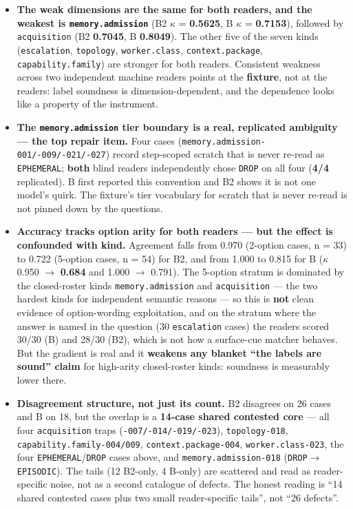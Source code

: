 \documentclass[11pt,a4paper]{article}
\begin{document}
\begin{itemize}
\item \textbf{The weak dimensions are the same for both readers, and the weakest is \texttt{memory.admission}} (B2 $\kappa$ = \textbf{0.5625}, B $\kappa$ = \textbf{0.7153}), followed by \texttt{acquisition} (B2 \textbf{0.7045}, B \textbf{0.8049}). The other five of the seven kinds (\texttt{escalation}, \texttt{topology}, \texttt{worker.class}, \texttt{context.package}, \texttt{capability.family}) are stronger for both readers. Consistent weakness across two independent machine readers points at the \textbf{fixture}, not at the readers: label soundness is dimension-dependent, and the dependence looks like a property of the instrument.
\item \textbf{The \texttt{memory.admission} tier boundary is a real, replicated ambiguity --- the top repair item.} Four cases (\texttt{memory.admission-001/-009/-021/-027}) record step-scoped scratch that is never re-read as \texttt{EPHEMERAL}; \textbf{both} blind readers independently chose \texttt{DROP} on all four (\textbf{4/4} replicated). B first reported this convention and B2 shows it is not one model's quirk. The fixture's tier vocabulary for scratch that is never re-read is not pinned down by the questions.
\item \textbf{Accuracy tracks option arity for both readers --- but the effect is confounded with kind.} Agreement falls from 0.970 (2-option cases, n = 33) to 0.722 (5-option cases, n = 54) for B2, and from 1.000 to 0.815 for B ($\kappa$ 0.950 $\to$ \textbf{0.684} and 1.000 $\to$ 0.791). The 5-option stratum is dominated by the closed-roster kinds \texttt{memory.admission} and \texttt{acquisition} --- the two hardest kinds for independent semantic reasons --- so this is \textbf{not} clean evidence of option-wording exploitation, and on the stratum where the answer is named in the question (30 \texttt{escalation} cases) the readers scored 30/30 (B) and 28/30 (B2), which is not how a surface-cue matcher behaves. But the gradient is real and it \textbf{weakens any blanket ``the labels are sound'' claim} for high-arity closed-roster kinds: soundness is measurably lower there.
\item \textbf{Disagreement structure, not just its count.} B2 disagrees on 26 cases and B on 18, but the overlap is a \textbf{14-case shared contested core} --- all four \texttt{acquisition} traps (\texttt{-007/-014/-019/-023}), \texttt{topology-018}, \texttt{capability.family-004/009}, \texttt{context.package-004}, \texttt{worker.class-023}, the four \texttt{EPHEMERAL}/\texttt{DROP} cases above, and \texttt{memory.admission-018} (\texttt{DROP$\to$EPISODIC}). The tails (12 B2-only, 4 B-only) are scattered and read as reader-specific noise, not as a second catalogue of defects. The honest reading is ``14 shared contested cases plus two small reader-specific tails'', not ``26 defects''.
\end{itemize}
\end{document}
